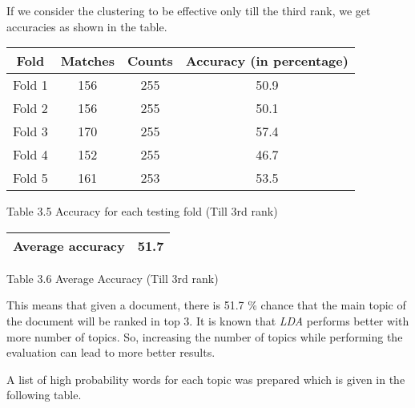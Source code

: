 \par 
If we consider the clustering to be effective only till the third rank, we get accuracies as shown in the table.

\begin{center}
\begin{tabular}{ |c|c|c|c| }
  \hline
  Fold & Matches & Counts & Accuracy (in percentage) \\ \hline
  Fold 1 & 156 & 255 & 50.9 \\ \hline
  Fold 2 & 156 & 255 & 50.1 \\ \hline
  Fold 3 & 170 & 255 & 57.4 \\ \hline
  Fold 4 & 152 & 255 & 46.7 \\ \hline
  Fold 5 & 161 & 253 & 53.5 \\ \hline
\end{tabular}
\end{center}
\begin{center}
 Table 3.5 Accuracy for each testing fold (Till 3rd rank)
\end{center}

\begin{center}
\begin{tabular}{ |c|c| }
  \hline
  Average accuracy & 51.7 \\ \hline
\end{tabular}
\end{center}
\begin{center}
 Table 3.6 Average Accuracy (Till 3rd rank)
\end{center}

\par 

This means that given a document, there is 51.7 \% chance that the main topic of the document will be ranked in top 3. It is known
that \textit{LDA} performs better with more number of topics. So, increasing the number of topics while performing the evaluation can 
lead to more better results. 

A list of high probability words for each topic was prepared which is given in the following table. 

